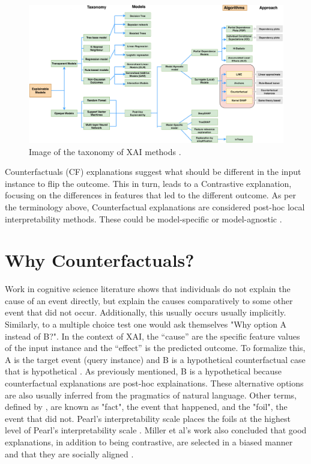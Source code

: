 \begin{figure}[h]
    \centering
    \includegraphics[width=1\textwidth]{images/taxonomy-xai.jpg}
    \caption{Image of the taxonomy of XAI methods \cite{chou2022counterfactuals}.}
    \label{fig:tax-xai}
\end{figure}

Counterfactuals (CF) explanations suggest what should be different in the input instance to flip the outcome. This in turn, leads to a Contrastive explanation, focusing on the differences in features that led to the different outcome. As per the terminology above, Counterfactual explanations are considered post-hoc local interpretability methods. These could be model-specific or model-agnostic \citep{guidotti2024counterfactual}.


\section{Why Counterfactuals?}
Work in cognitive science literature shows that individuals do not explain the cause 
of an event directly, but explain the causes comparatively to some other event that did not
occur. Additionally, this usually occurs usually implicitly. Similarly, to a multiple choice test one would ask
themselves "Why option A instead of B?". In the context of XAI, the “cause” are the specific feature values of
the input instance and the “effect” is the predicted outcome. To formalize this,
A is the target event (query instance) and B is a hypothetical counterfactual case that is hypothetical \citep{miller2019explanation}. 
As previously mentioned, B is a hypothetical because counterfactual explanations are post-hoc explainations. 
These alternative options are also usually inferred from the pragmatics of natural language.
Other terms, defined by \citet{lipton1990contrastive}, are known as "fact", the event that happened, and the "foil", the event that did not. Pearl’s interpretability scale places the foils
at the highest level of Pearl’s interpretability scale \citep{pearl2009causal}. 
Miller et al's work also concluded that good explanations, in addition to being contrastive,
are selected in a biased manner and that they are socially aligned \citep{miller2019explanation}.

